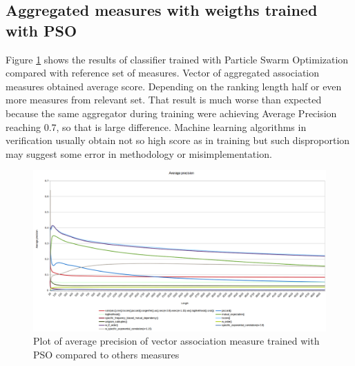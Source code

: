 \subsection{Aggregated measures with weigths trained with PSO}
Figure \ref{pso_verif} shows the results of classifier trained with Particle Swarm Optimization compared with reference set of measures. 
Vector of aggregated association measures obtained average score. Depending on the ranking length half or even more measures from 
relevant set. That result is much worse than expected because the same aggregator during training were achieving Average Precision 
reaching 0.7, so that is large difference. Machine learning algorithms in verification usually obtain not so high score as in training but 
such disproportion may suggest some error in methodology or misimplementation.

\begin{figure}[ht]
    \centering
    \includegraphics[scale=0.32]{img/pso_verif.png}
    \caption{Plot of average precision of vector association measure trained with PSO compared to others measures}
    \label{pso_verif}
\end{figure}